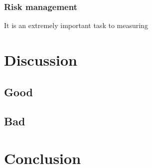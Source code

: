 \documentclass[openany,12pt]{ecsthesis}      %
\begin{document}
\subsection{Risk management}
It is an extremely important task to measuring
\chapter{Discussion}
\section{Good}
\section{Bad}
\chapter{Conclusion}
\backmatter


\end{document}
